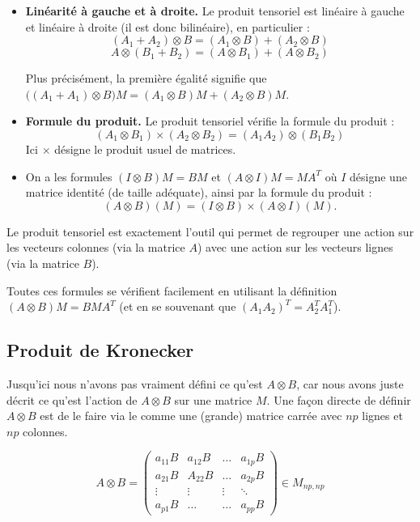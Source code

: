 \documentclass[11pt,class=report,crop=false]{standalone}
\begin{document}
\begin{itemize} 
	\item \textbf{Linéarité à gauche et à droite.}
Le produit tensoriel est linéaire à gauche et linéaire à droite (il est donc bilinéaire), en particulier :
$$(A_1 + A_2) \otimes B =  (A_1 \otimes B) + (A_2 \otimes B)$$
$$ A \otimes (B_1 + B_2) =  (A \otimes B_1) + (A \otimes B_2)$$

Plus précisément, la première égalité signifie que $\big(( A_1 + A_1) \otimes B\big) M =  (A_1 \otimes B)M + (A_2 \otimes B) M$.

   \item \textbf{Formule du produit.}
   Le produit tensoriel vérifie la formule du produit :
   $$(A_1 \otimes B_1) \times (A_2 \otimes B_2) = (A_1 A_2) \otimes (B_1 B_2)$$
   Ici \og{}$\times$\fg{} désigne le produit usuel de matrices.
   
   \item On a les formules $(I \otimes B)M = BM$ et $(A \otimes I)M = MA^T$ où $I$ désigne une matrice identité (de taille adéquate), ainsi par la formule du produit :
   $$ (A \otimes B)(M) = (I \otimes B) \times (A \otimes I) (M).$$
	
\end{itemize}

Le produit tensoriel est exactement l'outil qui permet de regrouper une action sur les vecteurs colonnes (via la matrice $A$) avec une action sur les vecteurs lignes (via la matrice $B$).


Toutes ces formules se vérifient facilement en utilisant la définition $(A \otimes B) M = BMA^T$ (et en se souvenant que $(A_1A_2)^T = A_2^T A_1^T$).   


\subsection{Produit de Kronecker}

Jusqu'ici nous n'avons pas vraiment défini ce qu'est $A \otimes B$, car nous avons juste décrit ce qu'est l'action de $A \otimes B$ sur une matrice $M$.
Une façon directe de définir $A \otimes B$ est de le faire via le  comme une (grande) matrice carrée avec $np$ lignes et $np$ colonnes.

$$A \otimes B = 
\begin{pmatrix} 
a_{11}B & a_{12}B & \dots  & a_{1p}B \\
a_{21}B & A_{22}B & \dots  & a_{2p}B \\
\vdots  & \vdots  & \vdots & \ddots  \\
a_{p1}B & \dots   & \dots  & a_{pp}B
\end{pmatrix}
\in M_{np,np}	
$$
\end{document}
